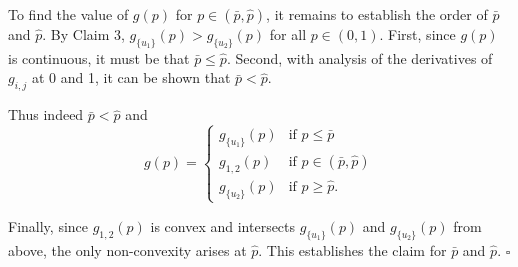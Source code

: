 \documentclass[12pt,a4paper]{article}
\newenvironment{original}
  {\par\noindent\color{black}\smallskip}
  {\par\smallskip}
\begin{document}
\begin{original}
To find the value of $g(p)$ for $p \in (\bar{p}, \hat{p})$, it remains to establish the order of $\bar{p}$ and $\hat{p}$. By Claim 3, $g_{\{u_1\}}(p) > g_{\{u_2\}}(p)$ for all $p \in (0, 1)$. First, since $g(p)$ is continuous, it must be that $\bar{p} \leq \hat{p}$. Second, with analysis of the derivatives of $g_{i,j}$ at 0 and 1, it can be shown that $\bar{p} < \hat{p}$.

Thus indeed $\bar{p} < \hat{p}$ and
\[
g(p) = \begin{cases}
g_{\{u_1\}}(p) & \text{if } p \leq \bar{p} \\
g_{1,2}(p) & \text{if } p \in (\bar{p}, \hat{p}) \\
g_{\{u_2\}}(p) & \text{if } p \geq \hat{p}.
\end{cases}
\]

Finally, since $g_{1,2}(p)$ is convex and intersects $g_{\{u_1\}}(p)$ and $g_{\{u_2\}}(p)$ from above, the only non-convexity arises at $\hat{p}$. This establishes the claim for $\bar{p}$ and $\hat{p}$. $\square$
\end{original}
\end{document}
